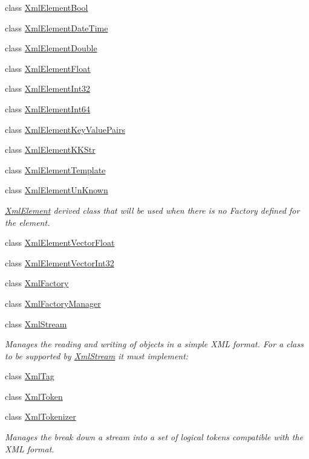 \begin{DoxyCompactItemize}
\item 
class \hyperlink{class_k_k_b_1_1_xml_element_bool}{Xml\+Element\+Bool}
\item 
class \hyperlink{class_k_k_b_1_1_xml_element_date_time}{Xml\+Element\+Date\+Time}
\item 
class \hyperlink{class_k_k_b_1_1_xml_element_double}{Xml\+Element\+Double}
\item 
class \hyperlink{class_k_k_b_1_1_xml_element_float}{Xml\+Element\+Float}
\item 
class \hyperlink{class_k_k_b_1_1_xml_element_int32}{Xml\+Element\+Int32}
\item 
class \hyperlink{class_k_k_b_1_1_xml_element_int64}{Xml\+Element\+Int64}
\item 
class \hyperlink{class_k_k_b_1_1_xml_element_key_value_pairs}{Xml\+Element\+Key\+Value\+Pairs}
\item 
class \hyperlink{class_k_k_b_1_1_xml_element_k_k_str}{Xml\+Element\+K\+K\+Str}
\item 
class \hyperlink{class_k_k_b_1_1_xml_element_template}{Xml\+Element\+Template}
\item 
class \hyperlink{class_k_k_b_1_1_xml_element_un_known}{Xml\+Element\+Un\+Known}
\begin{DoxyCompactList}\small\item\em \hyperlink{class_k_k_b_1_1_xml_element}{Xml\+Element} derived class that will be used when there is no Factory defined for the element.\end{DoxyCompactList}\item 
class \hyperlink{class_k_k_b_1_1_xml_element_vector_float}{Xml\+Element\+Vector\+Float}
\item 
class \hyperlink{class_k_k_b_1_1_xml_element_vector_int32}{Xml\+Element\+Vector\+Int32}
\item 
class \hyperlink{class_k_k_b_1_1_xml_factory}{Xml\+Factory}
\item 
class \hyperlink{class_k_k_b_1_1_xml_factory_manager}{Xml\+Factory\+Manager}
\item 
class \hyperlink{class_k_k_b_1_1_xml_stream}{Xml\+Stream}
\begin{DoxyCompactList}\small\item\em Manages the reading and writing of objects in a simple X\+ML format. For a class to be supported by \hyperlink{class_k_k_b_1_1_xml_stream}{Xml\+Stream} it must implement\+: \end{DoxyCompactList}\item 
class \hyperlink{class_k_k_b_1_1_xml_tag}{Xml\+Tag}
\item 
class \hyperlink{class_k_k_b_1_1_xml_token}{Xml\+Token}
\item 
class \hyperlink{class_k_k_b_1_1_xml_tokenizer}{Xml\+Tokenizer}
\begin{DoxyCompactList}\small\item\em Manages the break down a stream into a set of logical tokens compatible with the X\+ML format. \end{DoxyCompactList}\end{DoxyCompactItemize}
